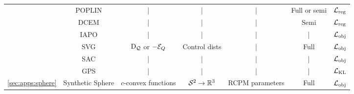 {\begin{tabular}{ccccccc}
& POPLIN & | & | & | & Full or semi & ${\mathcal{L}}_{\rm reg}$ \\
& DCEM & | & | & | & Semi & ${\mathcal{L}}_{\rm reg}$ \\
& IAPO & | & | & | & | & ${\mathcal{L}}_{\rm obj}$ \\
& SVG & $\mathrm{D}_{\mathcal{Q}}$ or $-{\mathcal{E}}_Q$ & Control dists & | & Full & ${\mathcal{L}}_{\rm obj}$ \\
& SAC & | & | & | & | & ${\mathcal{L}}_{\rm obj}$ \\
& GPS & | & | & | & | & ${\mathcal{L}}_{\rm KL}$ \\
\midrule
\ref{sec:apps:sphere} & Synthetic Sphere & $c$-convex functions & ${\mathcal{S}}^2\rightarrow \mathbb{R}^3$ & RCPM parameters & Full & ${\mathcal{L}}_{\rm obj}$ \\
\bottomrule
\end{tabular}}

